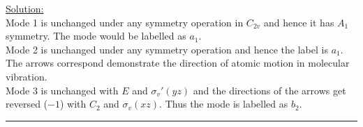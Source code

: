 \noindent
\underline{Solution:}\\

\noindent
Mode 1 is unchanged under any symmetry operation in $C_{2v}$ and hence it has $A_1$ symmetry. The mode would be labelled as $a_1$.\\
Mode 2 is unchanged under any symmetry operation and hence the label is $a_1$.\\
The arrows correspond demonstrate the direction of atomic motion in molecular vibration.\\ 
Mode 3 is unchanged with $E$ and $\sigma_v'(yz)$ and the directions of the arrows get reversed ($-1$) with
$C_2$ and $\sigma_v(xz)$. Thus the mode is labelled as $b_2$.\\

\hrule\vspace{0.5cm}



